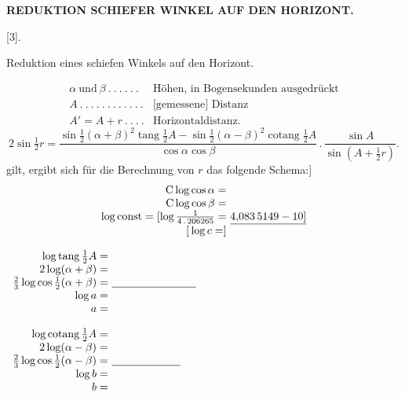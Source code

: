 \par\clearpage
\noindent\null\hfill{\small\textbf{REDUKTION SCHIEFER WINKEL AUF DEN HORIZONT.}}\hfill{}\par\bigskip
\begin{center}[3].\par\medskip
{\large Reduktion eines schiefen Winkels auf den Horizont.}\end{center}
\noindent [Es seien]
\[
\begin{array}{ll}
\alpha\ \text{und}\ \beta\ .\ .\ .\ .\ .\ .&\text{Höhen, in Bogensekunden ausgedrückt}\\
A\ .\ .\ .\ .\ .\ .\ .\ .\ .\ .\ .\ .&\text{[gemessene] Distanz}\\
A'=A+r\ .\ .\ .\ .&\text{Horizontaldistanz.}
\end{array}
\]
\[
2\sin\tfrac12r=\frac{\sin\frac12(\alpha+\beta)^2\operatorname{tang}\frac12A-\sin\frac12(\alpha-\beta)^2\operatorname{cotang}\frac12A}{\cos\alpha\cos\beta}\,.\,\frac{\sin A}{\sin(A+\frac12r)}.
\]
\noindent [Da angenähert
\[
\sin\tfrac12u=\frac{u''}{2\,.\,206265}\sqrt[3]{\cos\tfrac12u}
\]
\noindent gilt, ergibt sich für die Berechnung von $r$ das folgende Schema:]
\[
\begin{array}{r@{\ }l}
\mathrm C\log\cos\alpha=&\\
\mathrm C\log\cos\beta=&\\
\log\mathrm{const}=[\log\frac1{4\,.\,206265}=&\underline{4{,}083\,5149-10]}\\
{[}\log c=]&
\end{array}
\]
\noindent\begin{minipage}[t]{.49\linewidth}\centering
$\begin{array}{r@{\ }l}
\log\operatorname{tang}\tfrac12A=&\\
2\log(\alpha+\beta)=&\\
\tfrac23\log\cos\tfrac12(\alpha+\beta)=&\underline{\hspace{2.7cm}}\\
\log a=&\\
a=&
\end{array}$
\end{minipage}\hfill
\begin{minipage}[t]{.49\linewidth}\centering
$\begin{array}{r@{\ }l}
\log\operatorname{cotang}\tfrac12A=&\\
2\log(\alpha-\beta)=&\\
\tfrac23\log\cos\tfrac12(\alpha-\beta)=&\underline{\hspace{2.2cm}}\\
\log b=&\\
b=&
\end{array}$
\end{minipage}
